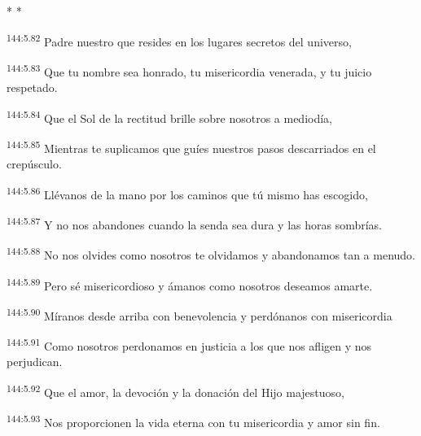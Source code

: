 \begin{center}
	\par * * *
\end{center}

\begin{center}
\par 
\textsuperscript{144:5.82} Padre nuestro que resides en los lugares secretos del universo,

\par 
\textsuperscript{144:5.83} Que tu nombre sea honrado, tu misericordia venerada, y tu juicio respetado.

\par 
\textsuperscript{144:5.84} Que el Sol de la rectitud brille sobre nosotros a mediodía,

\par 
\textsuperscript{144:5.85} Mientras te suplicamos que guíes nuestros pasos descarriados en el crepúsculo.

\par 
\textsuperscript{144:5.86} Llévanos de la mano por los caminos que tú mismo has escogido,

\par 
\textsuperscript{144:5.87} Y no nos abandones cuando la senda sea dura y las horas sombrías.

\par 
\textsuperscript{144:5.88} No nos olvides como nosotros te olvidamos y abandonamos tan a menudo.

\par 
\textsuperscript{144:5.89} Pero sé misericordioso y ámanos como nosotros deseamos amarte.

\par 
\textsuperscript{144:5.90} Míranos desde arriba con benevolencia y perdónanos con misericordia

\par 
\textsuperscript{144:5.91} Como nosotros perdonamos en justicia a los que nos afligen y nos perjudican.

\par 
\textsuperscript{144:5.92} Que el amor, la devoción y la donación del Hijo majestuoso,

\par 
\textsuperscript{144:5.93} Nos proporcionen la vida eterna con tu misericordia y amor sin fin.


\end{center}
